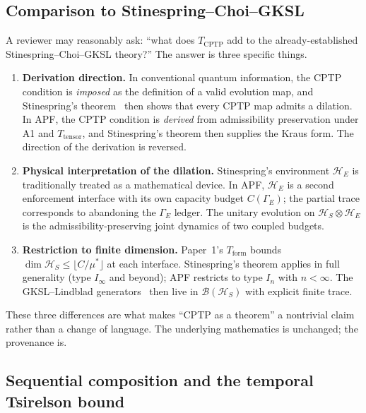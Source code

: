 \documentclass[11pt]{article}
\theoremstyle{remark}
\begin{document}
\subsection{Comparison to Stinespring--Choi--GKSL}

A reviewer may reasonably ask: ``what does $T_{\mathrm{CPTP}}$ add to the
already-established Stinespring--Choi--GKSL theory?''  The answer is three
specific things.

\begin{enumerate}
  \item \textbf{Derivation direction.}  In conventional quantum information,
  the CPTP condition is \emph{imposed} as the definition of a valid
  evolution map, and Stinespring's theorem~\cite{Stinespring1955} then
  shows that every CPTP map admits a dilation.  In APF, the CPTP condition
  is \emph{derived} from admissibility preservation under A1 and
  $T_{\mathrm{tensor}}$, and Stinespring's theorem then supplies the Kraus
  form.  The direction of the derivation is reversed.
  \item \textbf{Physical interpretation of the dilation.}  Stinespring's
  environment $\mathcal{H}_E$ is traditionally treated as a mathematical
  device.  In APF, $\mathcal{H}_E$ is a second enforcement interface with
  its own capacity budget $C(\Gamma_E)$; the partial trace corresponds to
  abandoning the $\Gamma_E$ ledger.  The unitary evolution on
  $\mathcal{H}_S \otimes \mathcal{H}_E$ is the admissibility-preserving
  joint dynamics of two coupled budgets.
  \item \textbf{Restriction to finite dimension.}  Paper~1's $T_{\mathrm{form}}$
  bounds $\dim \mathcal{H}_S \le \lfloor C/\mu^* \rfloor$ at each interface.
  Stinespring's theorem applies in full generality (type $I_\infty$ and
  beyond); APF restricts to type $I_n$ with $n < \infty$.  The
  GKSL--Lindblad generators~\cite{Lindblad1976,GKS1976} then live in
  $\mathcal{B}(\mathcal{H}_S)$ with explicit finite trace.
\end{enumerate}

\noindent These three differences are what makes ``CPTP as a theorem'' a
nontrivial claim rather than a change of language.  The underlying
mathematics is unchanged; the provenance is.

\subsection{Sequential composition and the temporal Tsirelson bound}
\end{document}
